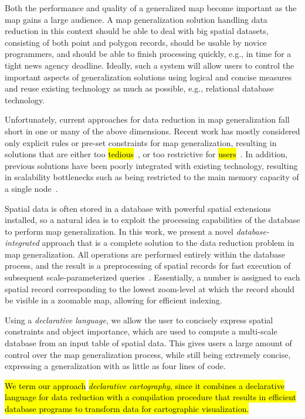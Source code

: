 Both the performance and quality of a generalized map become important as the map gains a large audience. A map generalization solution handling data reduction in this context should be able to deal with big spatial datasets, consisting of both point and polygon records, should be usable by novice programmers, and should be able to finish processing quickly, e.g., in time for a tight news agency deadline. Ideally, such a system will allow users to control the important aspects of generalization solutions using logical and concise measures and reuse existing technology as much as possible, e.g., relational database technology.

Unfortunately, current approaches for data reduction in map generalization fall short in one or many of the above dimensions. Recent work has mostly considered only explicit rules or pre-set constraints for map generalization, resulting in solutions that are either too \hl{tedious}~\cite{sld,mapnik}, or too restrictive for \hl{users}~\cite{sarma2012fusiontables,nutanong2012multiresolution}. In addition, previous solutions have been poorly integrated with existing technology, resulting in scalability bottlenecks such as being restricted to the main memory capacity of a single node~\cite{sarma2012fusiontables}. 
 

Spatial data is often stored in a database with powerful spatial extensions installed, so a natural idea is to exploit the processing capabilities of the database to perform map generalization. In this work, we present a novel \emph{database-integrated} approach that is a complete solution to the data reduction problem in map generalization. All operations are performed entirely within the database process, and the result is a preprocessing of spatial records for fast execution of subsequent scale-parameterized queries~\cite{hilbert1891ueber}. Essentially, a number is assigned to each spatial record corresponding to the lowest zoom-level at which the record should be visible in a zoomable map, allowing for efficient indexing.

Using a \emph{declarative language}, we allow the user to concisely express spatial constraints and object importance, which are used to compute a multi-scale database from an input table of spatial data. This gives users a large amount of control over the map generalization process, while still being extremely concise, expressing a generalization with as little as four lines of code. 

\hl{We term our approach }\emph{\hl{declarative cartography}}\hl{, since it combines a declarative language for data reduction with a compilation procedure that results in efficient database programs to transform data for cartographic visualization.}


